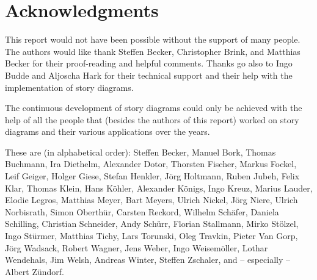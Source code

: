\section*{Acknowledgments}

This report would not have been possible without the support of many people. The authors would like thank Steffen Becker, Christopher Brink, and Matthias Becker for their proof-reading and helpful comments. Thanks go also to Ingo Budde and Aljoscha Hark for their technical support and their help with the implementation of story diagrams.

The continuous development of story diagrams could only be achieved with the help 
of all the people that (besides the authors of this report) worked on story diagrams and their various applications over the years.

These are (in alphabetical order): 
Steffen Becker, Manuel Bork, Thomas Buchmann, 
Ira Diethelm, Alexander Dotor, 
Thorsten Fischer, Markus Fockel,
Leif Geiger, Holger Giese, 
Stefan Henkler, J\"{o}rg Holtmann,
Ruben Jubeh,
Felix Klar, Thomas Klein, Hans K\"{o}hler, Alexander K\"{o}nigs, Ingo Kreuz, 
Marius Lauder, Elodie Legros,
Matthias Meyer, Bart Meyers, 
Ulrich Nickel, J\"{o}rg Niere, Ulrich Norbisrath,
Simon Oberth\"{u}r, 
Carsten Reckord, 
Wilhelm Sch\"{a}fer, Daniela Schilling, Christian Schneider, Andy Sch\"{u}rr, Florian Stallmann, Mirko St\"{o}lzel, Ingo St\"{u}rmer, 
Matthias Tichy, Lars Torunski, Oleg Travkin, 
Pieter Van Gorp, 
J\"{o}rg Wadsack, Robert Wagner, Jens Weber, Ingo Weisem\"{o}ller, Lothar Wendehals, Jim Welsh, Andreas Winter, 
Steffen Zschaler, and -- especially -- Albert Z\"{u}ndorf.